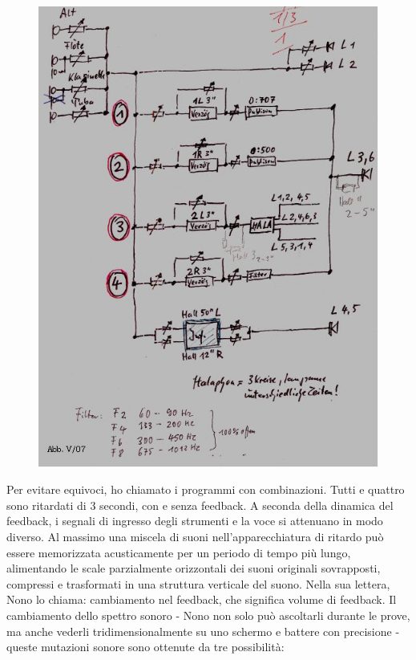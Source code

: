 \begin{figure}[htbp]
\begin{center}
\includegraphics[width=1\textwidth]{images/nono/hph/ab_v_07.jpg}
\caption{}
\label{hph-img7}
\end{center}
\end{figure}

Per evitare equivoci, ho chiamato i programmi con combinazioni. Tutti e quattro sono ritardati di 3 secondi, con e senza feedback. A seconda della dinamica del feedback, i segnali di ingresso degli strumenti e la voce si attenuano in modo diverso. Al massimo una miscela di suoni nell'apparecchiatura di ritardo può essere memorizzata acusticamente per un periodo di tempo più lungo, alimentando le scale parzialmente orizzontali dei suoni originali sovrapposti, compressi e trasformati in una struttura verticale del suono. Nella sua lettera, Nono lo chiama: cambiamento nel feedback, che significa volume di feedback. Il cambiamento dello spettro sonoro - Nono non solo può ascoltarli durante le prove, ma anche vederli tridimensionalmente su uno schermo e battere con precisione - queste mutazioni sonore sono ottenute da tre possibilità:

